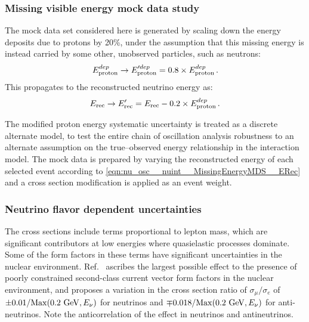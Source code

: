 \subsubsection{Missing visible energy mock data study}
\label{sec:nu_osc__nuint__MissingEnergyMDS}
The mock data set considered here is generated by scaling down the energy deposits due to protons by 20\%, under the assumption that this missing energy is instead carried by some other, unobserved particles, such as neutrons:
\begin{equation}
E_{\rm proton}^{dep} \rightarrow E_{\rm proton}^{\prime dep} = 0.8 \times E_{\rm proton}^{dep} \, .
\end{equation}
This propagates to the reconstructed neutrino energy as:
\begin{equation}
E_{\rm rec} \rightarrow E_{\rm rec}^{\prime} = E_{\rm rec} - 0.2 \times E_{\rm proton}^{dep} \, .
\label{eqn:nu_osc__nuint__MissingEnergyMDS__ERec}
\end{equation}


The modified proton energy systematic uncertainty is treated as a discrete alternate model, to test the entire chain of oscillation analysis robustness to an alternate assumption on the true--observed energy relationship in the interaction model. The mock data is prepared by varying the reconstructed energy of each selected event according to \eqref{eqn:nu_osc__nuint__MissingEnergyMDS__ERec} and a cross section modification is applied as an event weight.


\subsubsection{Neutrino flavor dependent uncertainties}
The cross sections include terms proportional to lepton mass, which are significant contributors at low energies where quasielastic processes dominate.  Some of the form factors in these terms have significant uncertainties in the nuclear environment.  Ref.~\cite{Day-McFarland:2012} ascribes the largest possible effect to the presence of poorly constrained second-class current vector form factors in the nuclear environment, and proposes a variation in the cross section ratio of $\sigma_\mu/\sigma_e$ of $\pm 0.01/{\rm\textstyle Max}(0.2~{\rm\textstyle GeV},E_\nu)$ for neutrinos and $\mp 0.018/{\rm\textstyle Max}(0.2~ {\rm\textstyle GeV},E_\nu)$ for anti-neutrinos.  Note the anticorrelation of the effect in neutrinos and antineutrinos.

